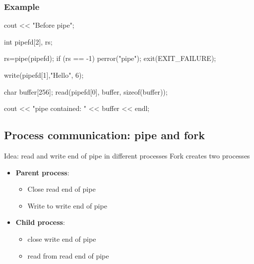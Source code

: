 \documentclass{report}
\begin{document}
        \bigbreak \noindent 
        \subsubsection{Example}
        \bigbreak \noindent 
        \begin{cppcode}
            cout << "Before pipe\n";

            int pipefd[2], rs;

            rs=pipe(pipefd);
            if (rs == -1) {
                perror("pipe");
                exit(EXIT_FAILURE);
            }

            write(pipefd[1],"Hello", 6);

            char buffer[256];
            read(pipefd[0], buffer, sizeof(buffer));

            cout << "pipe contained: " << buffer << endl;
        \end{cppcode}

        \bigbreak \noindent 
        \subsection{Process communication: pipe and fork}
        \bigbreak \noindent 
        Idea: read and write end of pipe in different processes
        \bigbreak \noindent 
        Fork creates two processes 
        \begin{itemize}
            \item \textbf{Parent process}:
                \begin{itemize}
                    \item Close read end of pipe
                    \item Write to write end of pipe
                \end{itemize}
            \item \textbf{Child process}:
                \begin{itemize}
                    \item close write end of pipe
                    \item read from read end of pipe
                \end{itemize}
        \end{itemize}

        \pagebreak 
\end{document}
